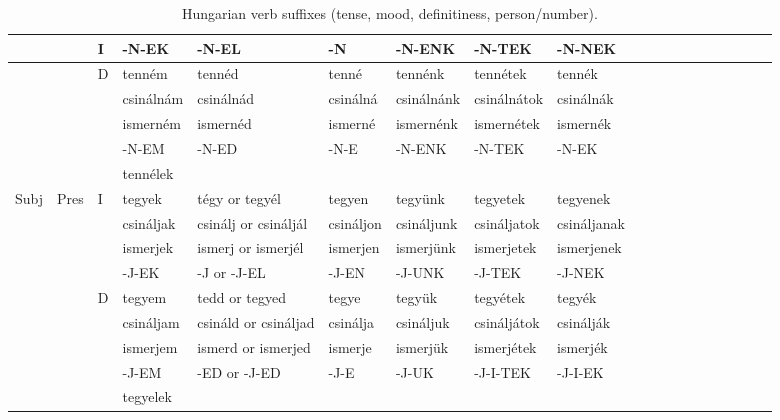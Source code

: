 \documentclass[11pt,letterpaper]{article}
\begin{document}
\begin{table}[]
{\begin{tabular}{lll||llllllllllllllll}
  & &   I    &-N-EK &	-N-EL &	-N &	-N-ENK &	-N-TEK &	-N-NEK \\\hline
   &&  D    &tenném &	tennéd &	tenné &	tennénk &	tennétek &	tennék \\
   &&       & csinálnám &	csinálnád &	csinálná &	csinálnánk &	csinálnátok &	csinálnák \\
 &&&  ismerném &	ismernéd &	ismerné &	ismernénk 	&ismernétek &	ismernék \\
&&      &-N-EM &	-N-ED &	-N-E &	-N-ENK &	-N-TEK &	-N-EK \\ \hline
       &&  &tennélek \\ \hline
Subj & Pres & I         &tegyek &	tégy or tegyél &	tegyen &	tegyünk &	tegyetek &	tegyenek \\
     &      &           & csináljak &	csinálj or
csináljál &	csináljon &	csináljunk& 	csináljatok &	csináljanak \\
&&&ismerjek &	ismerj or
ismerjél &	ismerjen &	ismerjünk &	ismerjetek &	ismerjenek \\
 &  &          &-J-EK &	-J or -J-EL &	-J-EN &	-J-UNK &	-J-TEK &	-J-NEK \\ \hline
&&D         &tegyem &	tedd or tegyed &	tegye &	tegyük& 	tegyétek &	tegyék \\
&&          & csináljam &	csináld or
csináljad &	csinálja &	csináljuk &	csináljátok &	csinálják \\
&&&ismerjem &	ismerd or
ismerjed &	ismerje &	ismerjük &	ismerjétek & ismerjék
 \\
&&         &-J-EM &	-ED or -J-ED &	-J-E &	-J-UK & 	-J-I-TEK &	-J-I-EK \\ \hline
  &&       &tegyelek \\
    \end{tabular}
    }
    \caption{Hungarian verb suffixes (tense, mood, definitiness, person/number).}
    \label{tab:my_label}
\end{table}
\end{document}
